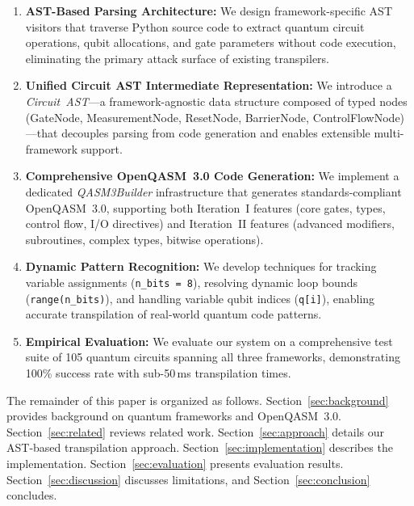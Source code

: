 \documentclass[conference]{IEEEtran}
\begin{document}
\begin{enumerate}
    \item \textbf{AST-Based Parsing Architecture:} We design framework-specific AST visitors that traverse Python source code to extract quantum circuit operations, qubit allocations, and gate parameters without code execution, eliminating the primary attack surface of existing transpilers.

    \item \textbf{Unified Circuit AST Intermediate Representation:} We introduce a \emph{Circuit~AST}---a framework-agnostic data structure composed of typed nodes (GateNode, MeasurementNode, ResetNode, BarrierNode, ControlFlowNode)---that decouples parsing from code generation and enables extensible multi-framework support.

    \item \textbf{Comprehensive OpenQASM~3.0 Code Generation:} We implement a dedicated \emph{QASM3Builder} infrastructure that generates standards-compliant OpenQASM~3.0, supporting both Iteration~I features (core gates, types, control flow, I/O directives) and Iteration~II features (advanced modifiers, subroutines, complex types, bitwise operations).

    \item \textbf{Dynamic Pattern Recognition:} We develop techniques for tracking variable assignments (\texttt{n\_bits = 8}), resolving dynamic loop bounds (\texttt{range(n\_bits)}), and handling variable qubit indices (\texttt{q[i]}), enabling accurate transpilation of real-world quantum code patterns.

    \item \textbf{Empirical Evaluation:} We evaluate our system on a comprehensive test suite of 105 quantum circuits spanning all three frameworks, demonstrating 100\% success rate with sub-50\,ms transpilation times.
\end{enumerate}

The remainder of this paper is organized as follows. Section~\ref{sec:background} provides background on quantum frameworks and OpenQASM~3.0. Section~\ref{sec:related} reviews related work. Section~\ref{sec:approach} details our AST-based transpilation approach. Section~\ref{sec:implementation} describes the implementation. Section~\ref{sec:evaluation} presents evaluation results. Section~\ref{sec:discussion} discusses limitations, and Section~\ref{sec:conclusion} concludes.

\end{document}
